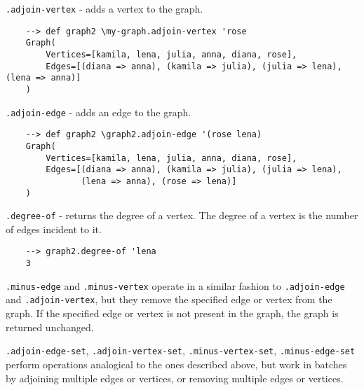 \vspace{0.25cm} \par \noindent \verb|.adjoin-vertex| - adds a vertex to the graph.

\begin{Verbatim}
    --> def graph2 \my-graph.adjoin-vertex 'rose
    Graph(
        Vertices=[kamila, lena, julia, anna, diana, rose],
        Edges=[(diana => anna), (kamila => julia), (julia => lena), (lena => anna)]
    )
\end{Verbatim}

\par \noindent \verb|.adjoin-edge| - adds an edge to the graph.

\begin{Verbatim}
    --> def graph2 \graph2.adjoin-edge '(rose lena)
    Graph(
        Vertices=[kamila, lena, julia, anna, diana, rose],
        Edges=[(diana => anna), (kamila => julia), (julia => lena),
               (lena => anna), (rose => lena)]
    )
\end{Verbatim}

\par \noindent \verb|.degree-of| - returns the degree of a vertex. The degree of a vertex is the number of edges incident to it.

\begin{Verbatim}
    --> graph2.degree-of 'lena
    3
\end{Verbatim}

\par \noindent \verb|.minus-edge| and \verb|.minus-vertex| operate in a similar fashion to \verb|.adjoin-edge| and \verb|.adjoin-vertex|, but they remove the specified edge or vertex from the graph. If the specified edge or vertex is not present in the graph, the graph is returned unchanged.

\vspace{0.25cm} \par \noindent \verb|.adjoin-edge-set|, \verb|.adjoin-vertex-set|, \verb|.minus-vertex-set|, \verb|.minus-edge-set| perform operations analogical to the ones described above, but work in batches by adjoining multiple edges or vertices, or removing multiple edges or vertices.

